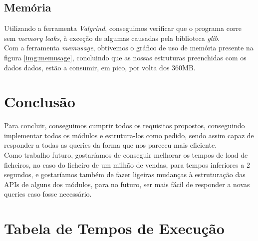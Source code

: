 \documentclass[a4paper]{report}
\begin{document}
\section{Memória}

Utilizando a ferramenta \textit{Valgrind}, conseguimos verificar que o programa
corre sem \textit{memory leaks}, à exceção de algumas causadas pela biblioteca
\textit{glib}.\\

Com a ferramenta \textit{memusage}, obtivemos o gráfico de uso de memória presente
na figura \ref{img:memusage}, concluindo que as nossas estruturas preenchidas com
os dados dados, estão a consumir, em pico, por volta dos 360MB.

\chapter{Conclusão}

Para concluir, conseguimos cumprir todos os requisitos propostos, conseguindo implementar
todos os módulos e estrutura-los como pedido, sendo assim capaz de responder a todas as 
queries da forma que nos pareceu mais eficiente.\\
Como trabalho futuro, gostaríamos de conseguir melhorar os tempos de load de ficheiros,
no caso do ficheiro de um milhão de vendas, para tempos inferiores a 2 segundos, e
gostaríamos também de fazer ligeiras mudanças à estruturação das APIs de alguns dos 
módulos, para no futuro, ser mais fácil de responder a novas queries caso fosse 
necessário.

\appendix

\chapter{Tabela de Tempos de Execução}
\end{document}
